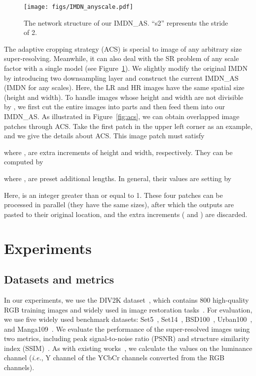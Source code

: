 \documentclass[sigconf]{acmart}
\newcommand{\ie}{\emph{i.e.}}
\begin{document}
\begin{figure}[htpb]
	\centering
	\texttt{[image: figs/IMDN\_anyscale.pdf]}
	\vspace{-3mm}
	\caption{The network structure of our IMDN\_AS. ``s2'' represents the stride of 2.}
	\label{fig:IMDN-anyscale}
\end{figure}

The adaptive cropping strategy (ACS) is special to image of any arbitrary size super-resolving. Meanwhile, it can also deal with the SR problem of any scale factor with a single model (see Figure~\ref{fig:IMDN-anyscale}). We slightly modify the original IMDN by introducing two downsampling layer and construct the current IMDN\_AS (IMDN for any scales). Here, the LR and HR images have the same spatial size (height and width). To handle images whose height and width are not divisible by , we first cut the entire images into  parts and then feed them into our IMDN\_AS. As illustrated in Figure~\ref{fig:acs}, we can obtain  overlapped image patches through ACS. Take the first patch in the upper left corner as an example, and we give the details about ACS. This image patch must satisfy

where ,  are extra increments of height and width, respectively. They can be computed by

where ,  are preset additional lengths. In general, their values are setting by

Here,  is an integer greater than or equal to 1. These four patches can be processed in parallel (they have the same sizes), after which the outputs are pasted to their original location, and the extra increments ( and ) are discarded.


\section{Experiments}\label{sec:experiemnts}
\subsection{Datasets and metrics}
In our experiments, we use the DIV2K dataset~\cite{NTIRE2017_dataset}, which contains 800 high-quality RGB training images and widely used in image restoration tasks~\cite{EDSR,RDN,RCAN,RNAN}. For evaluation, we use five widely used benchmark datasets: Set5~\cite{Set5}, Set14~\cite{Set14}, BSD100~\cite{BSD100}, Urban100~\cite{Urban100}, and Manga109~\cite{Manga109}. We evaluate the performance of the super-resolved images using two metrics, including peak signal-to-noise ratio (PSNR) and structure similarity index (SSIM)~\cite{SSIM}. As with existing works~\cite{VDSR,DRRN,EDSR,RDN,RCAN,IDN,CARN}, we calculate the values on the luminance channel (\ie, Y channel of the YCbCr channels converted from the RGB channels).
\end{document}
